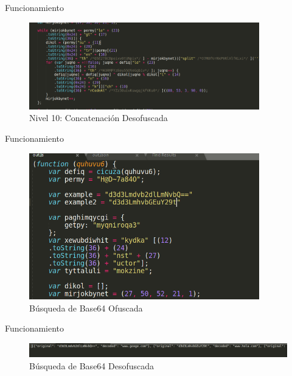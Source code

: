 \documentclass[aspectratio=169]{beamer}
\begin{document}
  	\begin{frame}{Funcionamiento}
	\begin{figure}[H]
		\centering
		\includegraphics[width=10cm]{images/level10_after.png}
		\caption{Nivel 10: Concatenación Desofuscada} 
	\end{figure}
  	\end{frame}
  	\begin{frame}{Funcionamiento}
	\begin{figure}[H]
		\centering
		\includegraphics[width=10cm]{images/base64_before.png}
		\caption{Búsqueda de Base64 Ofuscada} 
	\end{figure}
	
  	\end{frame}
  	\begin{frame}{Funcionamiento}
	\begin{figure}[H]
		\centering
		\includegraphics[width=15cm]{images/base64_after.png}
		\caption{Búsqueda de Base64 Desofuscada} 
	\end{figure}
  	\end{frame}
\end{document}
